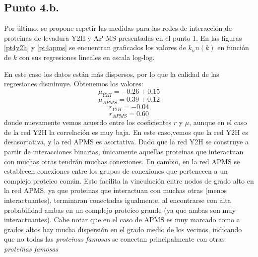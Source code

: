 \documentclass{article}
\begin{document}
\subsection{Punto 4.b.}
Por último, se propone repetir las medidas para las redes de interacción de proteinas de levadura Y2H y AP-MS presentadas en el punto 1. En las figuras \ref{pt4y2h} y \ref{pt4apms} se encuentran graficados los valores de $k_nn(k)$ en función de $k$ con sus regresiones lineales en escala log-log.

En este caso los datos están más dispersos, por lo que la calidad de las regresiones disminuye. Obtenemos los valores:
\begin{equation}
\mu_{Y2H} = -0.26 \pm 0.15
\end{equation}
\begin{equation}
\mu_{APMS} = 0.39 \pm 0.12 
\end{equation}
\begin{equation}
r_{Y2H} = -0.04
\end{equation}
\begin{equation}
r_{APMS} = 0.60 
\end{equation}
donde nuevamente vemos acuerdo entre los coeficientes $r$ y $\mu$, aunque en el caso de la red Y2H la correlación es muy baja. En este caso,vemos que la red Y2H es desasortativa, y la red APMS es asortativa. Dado que la red Y2H se construye a partir de interacciones binarias, únicamente aquellas proteinas que interactuan con muchas otras tendrán muchas conexiones. En cambio, en la red APMS se establecen conexiones entre los grupos de conexiones que pertenecen a un complejo proteico común. Esto facilita la vinculación entre nodos de grado alto en la red APMS, ya que proteinas que interactuan con muchas otras (menos interactuantes), terminaran conectadas igualmente, al encontrarse con alta probabilidad ambas en un complejo proteico grande (ya que ambas son muy interactuantes). Cabe notar que en el caso de APMS es muy marcado como a grados altos hay mucha dispersión en el grado medio de los vecinos, indicando que no todas las \textit{proteinas famosas} se conectan principalmente con otras \textit{proteinas famosas}
\end{document}
